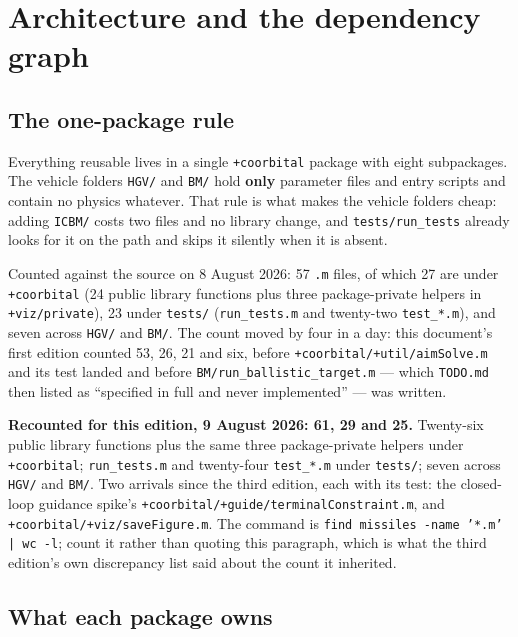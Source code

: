 \documentclass[11pt]{article}
\newcommand{\code}[1]{\texttt{#1}}
\begin{document}
\section{Architecture and the dependency graph}
\label{sec:arch}

\subsection{The one-package rule}

Everything reusable lives in a single \code{+coorbital} package with eight
subpackages. The vehicle folders \code{HGV/} and \code{BM/} hold
\textbf{only} parameter files and entry scripts and contain no physics
whatever. That rule is what makes the vehicle folders cheap: adding
\code{ICBM/} costs two files and no library change, and \code{tests/run\_tests}
already looks for it on the path and skips it silently when it is absent.

Counted against the source on 8 August 2026: 57 \code{.m} files, of which 27
are under \code{+coorbital} (24 public library functions plus three
package-private helpers in \code{+viz/private}), 23 under \code{tests/}
(\code{run\_tests.m} and twenty-two \code{test\_*.m}), and seven across
\code{HGV/} and \code{BM/}. The count moved by four in a day: this document's
first edition counted 53, 26, 21 and six, before
\code{+coorbital/+util/aimSolve.m} and its test landed and before
\code{BM/run\_ballistic\_target.m} --- which \code{TODO.md} then listed as
``specified in full and never implemented'' --- was written.

\textbf{Recounted for this edition, 9 August 2026: 61, 29 and 25.} Twenty-six
public library functions plus the same three package-private helpers under
\code{+coorbital}; \code{run\_tests.m} and twenty-four \code{test\_*.m} under
\code{tests/}; seven across \code{HGV/} and \code{BM/}. Two arrivals since the
third edition, each with its test: the closed-loop guidance spike's
\code{+coorbital/+guide/terminalConstraint.m}, and
\code{+coorbital/+viz/saveFigure.m}. The command is
\code{find missiles -name '*.m' | wc -l}; count it rather than quoting this
paragraph, which is what the third edition's own discrepancy list said about
the count it inherited.

\subsection{What each package owns}
\end{document}

